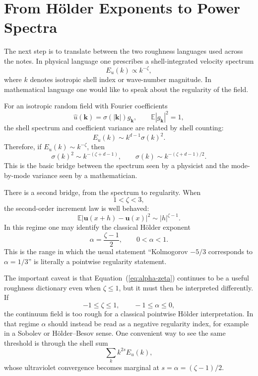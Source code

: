 \documentclass[11pt]{article}
\newcommand{\E}{\mathbb{E}}
\newcommand{\uu}{\mathbf{u}}
\newcommand{\kk}{\mathbf{k}}
\begin{document}
\section{From H\"older Exponents to Power Spectra}
The next step is to translate between the two roughness languages used across the notes. In physical language one prescribes a shell-integrated velocity spectrum
\begin{equation}
E_u(k)\propto k^{-\zeta},
\label{eq:eu}
\end{equation}
where $k$ denotes isotropic shell index or wave-number magnitude. In mathematical language one would like to speak about the regularity of the field.

For an isotropic random field with Fourier coefficients
\begin{equation}
\widehat{u}(\kk)=\sigma(|\kk|)g_\kk,
\qquad
\E|g_\kk|^2=1,
\end{equation}
the shell spectrum and coefficient variance are related by shell counting:
\begin{equation}
E_u(k)\sim k^{d-1}\sigma(k)^2.
\label{eq:shell-count}
\end{equation}
Therefore, if $E_u(k)\sim k^{-\zeta}$, then
\begin{equation}
\sigma(k)^2 \sim k^{-(\zeta+d-1)},
\qquad
\sigma(k)\sim k^{-(\zeta+d-1)/2}.
\label{eq:sigma-law}
\end{equation}
This is the basic bridge between the spectrum seen by a physicist and the mode-by-mode variance seen by a mathematician.

There is a second bridge, from the spectrum to regularity. When
\begin{equation}
1<\zeta<3,
\label{eq:zeta-window}
\end{equation}
the second-order increment law is well behaved:
\begin{equation}
\E|\uu(x+h)-\uu(x)|^2 \sim |h|^{\zeta-1}.
\end{equation}
In this regime one may identify the classical H\"older exponent
\begin{equation}
\alpha = \frac{\zeta-1}{2},
\qquad
0<\alpha<1.
\label{eq:alpha-zeta}
\end{equation}
This is the range in which the usual statement ``Kolmogorov $-5/3$ corresponds to $\alpha=1/3$'' is literally a pointwise regularity statement.

The important caveat is that Equation~(\ref{eq:alpha-zeta}) continues to be a useful roughness dictionary even when $\zeta\le 1$, but it must then be interpreted differently. If
\begin{equation}
-1\le \zeta \le 1,
\qquad
-1\le \alpha \le 0,
\end{equation}
the continuum field is too rough for a classical pointwise H\"older interpretation. In that regime $\alpha$ should instead be read as a negative regularity index, for example in a Sobolev or H\"older--Besov sense. One convenient way to see the same threshold is through the shell sum
\begin{equation}
\sum_k k^{2s}E_u(k),
\end{equation}
whose ultraviolet convergence becomes marginal at $s=\alpha=(\zeta-1)/2$.
\end{document}
